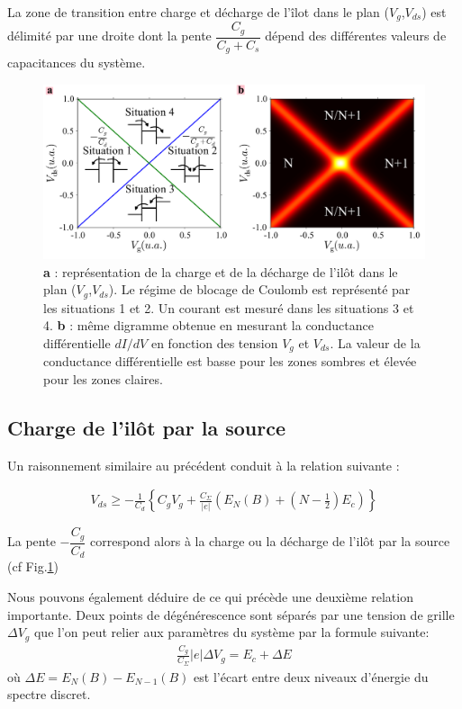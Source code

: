 La zone de transition entre charge et décharge de l'\^ilot dans le plan ($V_g$,$V_{ds}$) est délimité par une droite dont la pente $\dfrac{C_g}{C_g + C_s}$ dépend des différentes valeurs de capacitances du système.


\begin{figure}
\includegraphics[scale=0.5]{Theorie/Transport/figure3/figure3.pdf} 
\caption{\textbf{a} : représentation de la charge et de la décharge de l'il\^ot dans le plan ($V_g$,$V_{ds}$). Le régime de blocage de Coulomb est représenté par les situations 1 et 2. Un courant est mesuré dans les situations 3 et 4. \textbf{b} : m\^eme digramme obtenue en mesurant la conductance différentielle $dI/dV$ en fonction des tension $V_g$ et $V_{ds}$. La valeur de la conductance différentielle est basse pour les zones sombres et élevée pour les zones claires.}
\label{charge_discharge}
\end{figure}



\subsection{Charge de l'il\^ot par la source}
Un raisonnement similaire au précédent conduit à la relation suivante :

\begin{eqnarray}
V_{ds} \geq -\frac{1}{C_d} \left\lbrace C_gV_g + \frac{C_{\Sigma}}{|e|}\left( E_N(B) + (N-\frac{1}{2})E_c \right) \right\rbrace
\end{eqnarray}


La pente $-\dfrac{C_g}{C_d}$ correspond alors à la charge ou la décharge de l'il\^ot par la source (cf Fig.\ref{charge_discharge})

Nous pouvons également déduire de ce qui précède une deuxième relation importante. Deux points de dégénérescence sont séparés par une tension de grille $\Delta V_g$ que l'on peut relier aux paramètres du système par la formule suivante:
\begin{eqnarray}
\frac{C_g}{C_{\Sigma}} |e| \Delta V_g = E_c + \Delta E
\end{eqnarray}
où $\Delta E = E_N(B) - E_{N-1}(B)$ est l'écart entre deux niveaux d'énergie du spectre discret.



